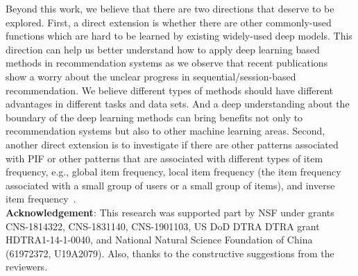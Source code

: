 \documentclass[sigconf]{acmart}
\begin{document}
Beyond this work, we believe that there are two  directions that deserve to be explored. First, a direct  extension is whether there are other commonly-used functions which are hard to be learned by existing widely-used deep  models. This direction can help us better understand how to apply deep learning based  methods in recommendation systems as we observe that recent  publications~\cite{ludewig2019performance} show a worry about the  unclear progress  in  sequential/session-based recommendation.  We  believe  different types  of methods should  have  different advantages in  different tasks and data sets. And a deep understanding about the boundary of the deep learning methods can bring benefits not only to recommendation systems but also to other machine learning areas. Second, another direct extension is to investigate if there are other patterns associated with PIF or other patterns that are associated with  different types of item frequency, e.g., global item frequency, local item frequency (the item  frequency associated with a small group of users or a small group of items), and inverse item  frequency~\cite{sharma2019adaptive}. 
\\
\textbf{Acknowledgement}:
This research was supported  part by NSF under grants CNS-1814322, CNS-1831140,  CNS-1901103, US DoD DTRA DTRA  grant HDTRA1-14-1-0040, and National Natural Science Foundation of China (61972372,  U19A2079). Also, thanks to the  constructive suggestions from the  reviewers.



\end{document}
